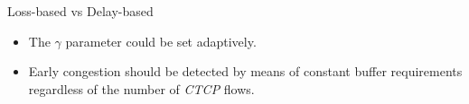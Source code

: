 \begin{frame}{Loss-based vs Delay-based}
        \begin{itemize}
		\item The $\gamma$ parameter could be set adaptively.
		\item Early congestion should be detected 
		      by means of constant buffer requirements 
		      regardless of the number of \textit{CTCP} flows.
        \end{itemize}
\end{frame}

